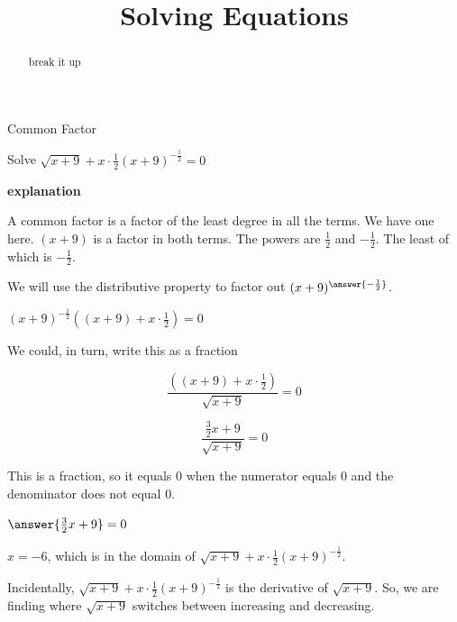 \documentclass{ximera}
\title{Solving Equations}
\begin{document}
\begin{abstract}
break it up
\end{abstract}
\maketitle





\begin{example}  Common Factor


Solve $\sqrt{x+9} + x \cdot \frac{1}{2} (x+9)^{-\tfrac{1}{2}} = 0$



\textbf{\textcolor{red!75!green}{explanation}} 



A common factor is a factor of the least degree in all the terms.  We have one here. $(x+9)$ is a factor in both terms.  The powers are $\frac{1}{2}$ and $-\frac{1}{2}$. The least of which is $-\frac{1}{2}$.

We will use the distributive property to factor out $(x+9)^{\answer{-\frac{1}{2}}}$.


$(x+9)^{-\tfrac{1}{2}} \left((x+9) + x \cdot \frac{1}{2}\right)  = 0$


We could, in turn, write this as a fraction


\[  \frac{\left((x+9) + x \cdot \frac{1}{2}\right)}{\sqrt{x+9}} = 0 \]


\[  \frac{ \frac{3}{2} x + 9}{\sqrt{x+9}} = 0 \]



This is a fraction, so it equals $0$ when the numerator equals $0$ and the denominator does not equal $0$.


$\answer{\frac{3}{2} x + 9} = 0$



$x = -6$, which is in the domain of $\sqrt{x+9} + x \cdot \frac{1}{2} (x+9)^{-\tfrac{1}{2}}$.




\end{example}




Incidentally, $\sqrt{x+9} + x \cdot \frac{1}{2} (x+9)^{-\tfrac{1}{2}}$ is the derivative of $\sqrt{x+9}$.  So, we are finding where $\sqrt{x+9}$ switches between increasing and decreasing.
\end{document}

